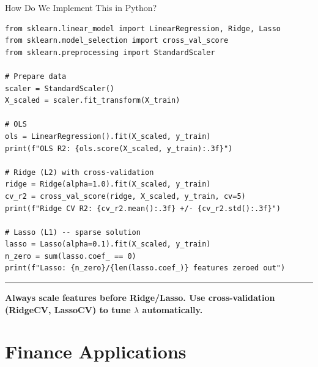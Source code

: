 \documentclass[8pt,aspectratio=169]{beamer}
\newcommand{\bottomnote}[1]{%
\vfill
\vspace{-2mm}
\textcolor{mllavender2}{\rule{\textwidth}{0.4pt}}
\vspace{1mm}
\footnotesize
\textbf{#1}
}
\begin{document}
\begin{frame}[fragile]{How Do We Implement This in Python?}
\small
\begin{verbatim}
from sklearn.linear_model import LinearRegression, Ridge, Lasso
from sklearn.model_selection import cross_val_score
from sklearn.preprocessing import StandardScaler

# Prepare data
scaler = StandardScaler()
X_scaled = scaler.fit_transform(X_train)

# OLS
ols = LinearRegression().fit(X_scaled, y_train)
print(f"OLS R2: {ols.score(X_scaled, y_train):.3f}")

# Ridge (L2) with cross-validation
ridge = Ridge(alpha=1.0).fit(X_scaled, y_train)
cv_r2 = cross_val_score(ridge, X_scaled, y_train, cv=5)
print(f"Ridge CV R2: {cv_r2.mean():.3f} +/- {cv_r2.std():.3f}")

# Lasso (L1) -- sparse solution
lasso = Lasso(alpha=0.1).fit(X_scaled, y_train)
n_zero = sum(lasso.coef_ == 0)
print(f"Lasso: {n_zero}/{len(lasso.coef_)} features zeroed out")
\end{verbatim}

\bottomnote{Always scale features before Ridge/Lasso. Use cross-validation (RidgeCV, LassoCV) to tune $\lambda$ automatically.}
\end{frame}

\section{Finance Applications}
\end{document}

